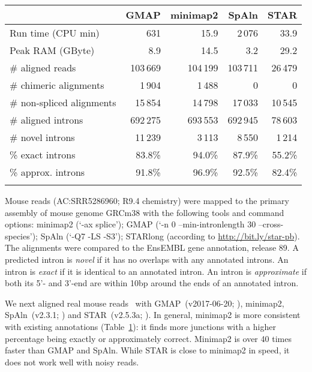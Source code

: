 \documentclass{bioinfo}
\begin{document}
\begin{table}[!tb]
{\footnotesize\label{tab:intron}
\begin{tabular}{p{3.1cm}rrrr}
\toprule
& GMAP & minimap2 & SpAln & STAR\\
\midrule
Run time (CPU min)        & 631      & 15.9     & 2\,076   & 33.9 \\
Peak RAM (GByte)          & 8.9      & 14.5     & 3.2      & 29.2\vspace{1em}\\
\# aligned reads          & 103\,669 & 104\,199 & 103\,711 & 26\,479 \\
\# chimeric alignments    & 1\,904   & 1\,488   & 0        & 0 \\
\# non-spliced alignments & 15\,854  & 14\,798  & 17\,033  & 10\,545\vspace{1em}\\
\# aligned introns        & 692\,275 & 693\,553 & 692\,945 & 78\,603 \\
\# novel introns          & 11\,239  & 3\,113   & 8\,550   & 1\,214 \\
\% exact introns          & 83.8\%   & 94.0\%   & 87.9\%   & 55.2\% \\
\% approx. introns        & 91.8\%   & 96.9\%   & 92.5\%   & 82.4\% \\
\botrule
\end{tabular}
}{Mouse reads (AC:SRR5286960; R9.4 chemistry) were mapped to the primary assembly of mouse
genome GRCm38 with the following tools and command options: minimap2 (`-ax
splice'); GMAP (`-n 0 --min-intronlength 30 --cross-species'); SpAln (`-Q7 -LS
-S3'); STARlong (according to
\href{http://bit.ly/star-pb}{http://bit.ly/star-pb}). The alignments were
compared to the EnsEMBL gene annotation, release 89. A predicted intron
is \emph{novel} if it has no overlaps with any annotated introns. An intron
is \emph{exact} if it is identical to an annotated intron. An intron is
\emph{approximate} if both its 5'- and 3'-end are within 10bp around the ends
of an annotated intron.}
\end{table}

We next aligned real mouse reads~\citep{Byrne:2017aa} with GMAP~(v2017-06-20;
\citealp{Wu:2005vn}), minimap2, SpAln~(v2.3.1; \citealp{Iwata:2012aa}) and
STAR~(v2.5.3a; \citealp{Dobin:2013kx}). In general, minimap2 is more
consistent with existing annotations (Table~\ref{tab:intron}): it finds
more junctions with a higher percentage being exactly or approximately correct.
Minimap2 is over 40 times faster than GMAP and SpAln. While STAR is close to
minimap2 in speed, it does not work well with noisy reads.
\end{document}
